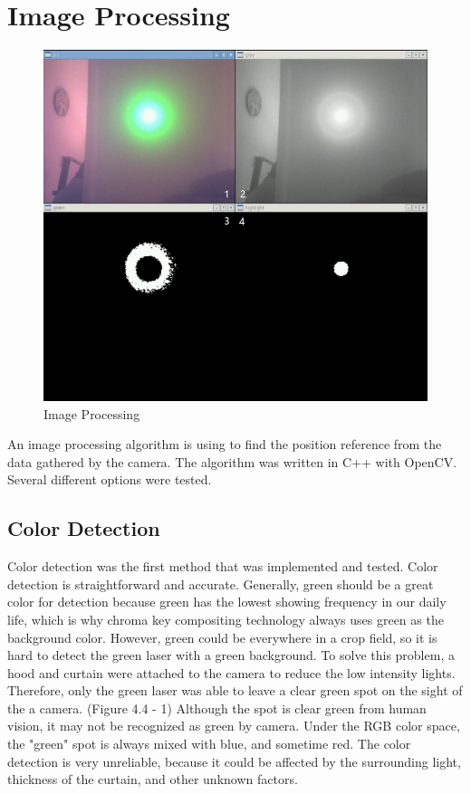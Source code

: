 \section{Image Processing}
\begin{figure}[ht!]
\begin{center}
\includegraphics[scale = 0.7]{pics/imaging.jpg}
\caption{Image Processing}
\end{center}
\end{figure}
An image processing algorithm is using to find the position reference from the data gathered by the camera. The algorithm was written in C++ with OpenCV. Several different options were tested.

\subsection{Color Detection}

Color detection was the first method that was implemented and tested. Color detection is straightforward and accurate. Generally, green should be a great color for detection because green has the lowest showing frequency in our daily life, which is why chroma key compositing technology always uses green as the background color. However, green could be everywhere in a crop field, so it is hard to detect the green laser with a green background. To solve this problem, a hood and curtain were attached to the camera to reduce the low intensity lights. Therefore, only the green laser was able to leave a clear green spot on the sight of the a camera. (Figure 4.4 - 1) Although the spot is clear green from human vision, it may not be recognized as green by camera. Under the RGB color space, the "green" spot is always mixed with blue, and sometime red. The color detection is very unreliable, because it could be affected by the surrounding light, thickness of the curtain, and other unknown factors.
